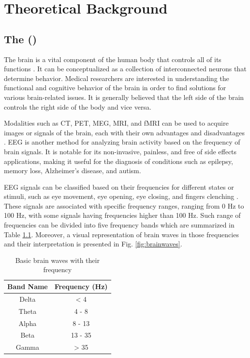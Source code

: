 \chapter{Theoretical Background}
\section{The  ()}
The brain is a vital component of the human body that controls all of its functions \cite{kumar_analysis_2012}. It can be conceptualized as a collection of interconnected neurons that determine behavior. Medical researchers are interested in understanding the functional and cognitive behavior of the brain in order to find solutions for various brain-related issues. It is generally believed that the left side of the brain controls the right side of the body and vice versa. 

Modalities such as \gls{CT}, \gls{PET}, \gls{MEG}, \gls{MRI}, and \gls{fMRI} can be used to acquire images or signals of the brain, each with their own advantages and disadvantages \cite{hajare_comparative_2021}. \gls{EEG} is another method for analyzing brain activity based on the frequency of brain signals. It is notable for its non-invasive, painless, and free of side effects applications, making it useful for the diagnosis of conditions such as epilepsy, memory loss, Alzheimer's disease, and autism. 

\gls{EEG} signals can be classified based on their frequencies for different states or stimuli, such as eye movement, eye opening, eye closing, and fingers clenching \cite{kumar_analysis_2012}. These signals are associated with specific frequency ranges, ranging from 0 Hz to 100 Hz, with some signals having frequencies higher than 100 Hz. Such range of frequencies can be divided into five frequency bands which are summarized in Table \ref{tab:brain-frequency}. Moreover, a visual representation of brain waves in those frequencies and their interpretation is presented in Fig. \ref{fig:brainwaves}.


\begin{table}[ht]
    \centering
    \begin{tabular}{cc}
    \hline
    \textbf{Band Name} & \textbf{Frequency (Hz)}    \\ \hline
    Delta              & \textless{} 4              \\
    Theta              & 4 - 8                      \\
    Alpha              & 8 - 13                     \\
    Beta               & 13 - 35                    \\
    Gamma              & \textgreater{} 35          \\ \hline
    \end{tabular}
    \caption{Basic brain waves with their frequency \cite{jiang_removal_2019, abhang_chapter_2016}}
    \label{tab:brain-frequency}
\end{table}

